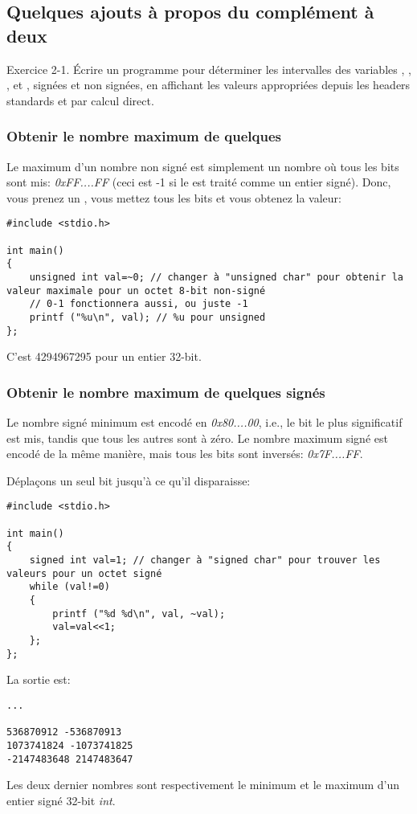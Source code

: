 \subsection{Quelques ajouts à propos du complément à deux}

\epigraph{Exercice 2-1. Écrire un programme pour déterminer les intervalles des variables
, , , et , signées et non signées, en affichant
les valeurs appropriées depuis les headers standards et par calcul direct.}{\KRBook}

\subsubsection{Obtenir le nombre maximum de quelques }

Le maximum d'un nombre non signé est simplement un nombre où tous les bits sont mis:
\emph{0xFF....FF} (ceci est -1 si le  est traité comme un entier
signé).
Donc, vous prenez un , vous mettez tous les bits et vous obtenez
la valeur:

\begin{lstlisting}[style=customc]
#include <stdio.h>

int main()
{
	unsigned int val=~0; // changer à "unsigned char" pour obtenir la valeur maximale pour un octet 8-bit non-signé
	// 0-1 fonctionnera aussi, ou juste -1
	printf ("%u\n", val); // %u pour unsigned
};
\end{lstlisting}

C'est 4294967295 pour un entier 32-bit.

\subsubsection{Obtenir le nombre maximum de quelques  signés}

Le nombre signé minimum est encodé en \emph{0x80....00}, i.e., le bit le plus significatif
est mis, tandis que tous les autres sont à zéro.
Le nombre maximum signé est encodé de la même manière, mais tous les bits sont
inversés: \emph{0x7F....FF}.

Déplaçons un seul bit jusqu'à ce qu'il disparaisse:

\begin{lstlisting}[style=customc]
#include <stdio.h>

int main()
{
	signed int val=1; // changer à "signed char" pour trouver les valeurs pour un octet signé
	while (val!=0)
	{
		printf ("%d %d\n", val, ~val);
		val=val<<1;
	};
};
\end{lstlisting}

La sortie est:

\begin{lstlisting}
...

536870912 -536870913
1073741824 -1073741825
-2147483648 2147483647
\end{lstlisting}

Les deux dernier nombres sont respectivement le minimum et le maximum d'un entier
signé 32-bit \emph{int}.

